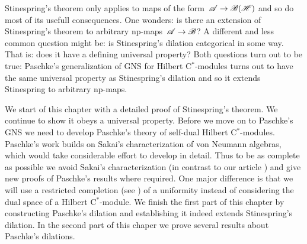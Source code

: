 \documentclass[b]{subfiles}
\begin{document}
\begin{parsec}
\begin{point}
Stinespring's theorem only applies
to maps of the form~$\mathscr{A} \to \mathscr{B}(\mathscr{H})$
    and so do most of its usefull consequences.
One wonders:
    is there an extension of Stinespring's theorem
    to arbitrary np-maps~$\mathscr{A} \to \mathscr{B}$?
A different and less common question might be:
    is Stinespring's dilation categorical in some way.
That is: does it have a defining universal property?
Both questions turn out to be true:
Paschke's generalization of GNS for Hilbert C$^*$-modules\cite{paschke}
    turns out to have the same universal property
        as Stinespring's dilation and so it extends Stinespring
        to arbitrary np-maps.

We start of this chapter with a detailed proof of Stinespring's theorem.
We continue to show it obeys a universal property.
Before we move on to Paschke's GNS
    we need to develop Paschke's theory of self-dual Hilbert C$^*$-modules.
Paschke's work builds on Sakai's characterization of von Neumann algebras,
    which would take considerable effort to develop in detail.
Thus to be as complete as possible
we avoid Sakai's characterization (in contrast to our
    article \cite{wwpaschke})
    and give new proofs
    of Paschke's results where required.
One major difference is that we will use
    a restricted completion (see \TODO{}) of a uniformity
    instead of considering the dual space of a Hilbert C$^*$-module.
We finish the first part of this chapter
    by constructing Paschke's dilation
    and establishing it indeed extends Stinespring's dilation.
In the second part of this chaper
    we prove several results about Paschke's dilations.
\end{point}
\end{parsec}
\end{document}
